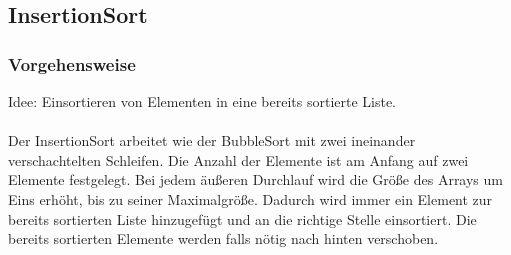 \documentclass{article}
\begin{document}

\subsection{InsertionSort}

\subsubsection{Vorgehensweise}
Idee: Einsortieren von Elementen in eine bereits sortierte Liste. \\ \\
Der InsertionSort arbeitet wie der BubbleSort mit zwei ineinander verschachtelten Schleifen. Die Anzahl der Elemente ist am Anfang auf zwei Elemente festgelegt. Bei jedem äußeren Durchlauf wird die Größe des Arrays um Eins erhöht, bis zu seiner Maximalgröße. Dadurch wird immer ein Element zur bereits sortierten Liste hinzugefügt und an die richtige Stelle einsortiert. Die bereits sortierten Elemente werden falls nötig nach hinten verschoben.
\end{document}
